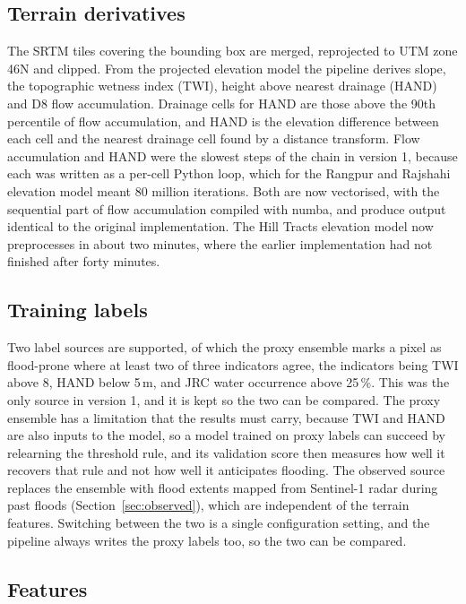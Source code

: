 \documentclass[10pt,a4paper,twocolumn]{article}
\begin{document}
\subsection{Terrain derivatives}

The SRTM tiles covering the bounding box are merged, reprojected to UTM zone 46N and clipped. From the projected elevation model the pipeline derives slope, the topographic wetness index (TWI), height above nearest drainage (HAND) and D8 flow accumulation. Drainage cells for HAND are those above the 90th percentile of flow accumulation, and HAND is the elevation difference between each cell and the nearest drainage cell found by a distance transform. Flow accumulation and HAND were the slowest steps of the chain in version 1, because each was written as a per-cell Python loop, which for the Rangpur and Rajshahi elevation model meant 80 million iterations. Both are now vectorised, with the sequential part of flow accumulation compiled with numba, and produce output identical to the original implementation. The Hill Tracts elevation model now preprocesses in about two minutes, where the earlier implementation had not finished after forty minutes.

\subsection{Training labels}
\label{sec:labels}

Two label sources are supported, of which the proxy ensemble marks a pixel as flood-prone where at least two of three indicators agree, the indicators being TWI above 8, HAND below 5\,m, and JRC water occurrence above 25\,\%. This was the only source in version 1, and it is kept so the two can be compared. The proxy ensemble has a limitation that the results must carry, because TWI and HAND are also inputs to the model, so a model trained on proxy labels can succeed by relearning the threshold rule, and its validation score then measures how well it recovers that rule and not how well it anticipates flooding. The observed source replaces the ensemble with flood extents mapped from Sentinel-1 radar during past floods (Section~\ref{sec:observed}), which are independent of the terrain features. Switching between the two is a single configuration setting, and the pipeline always writes the proxy labels too, so the two can be compared.

\subsection{Features}
\end{document}
